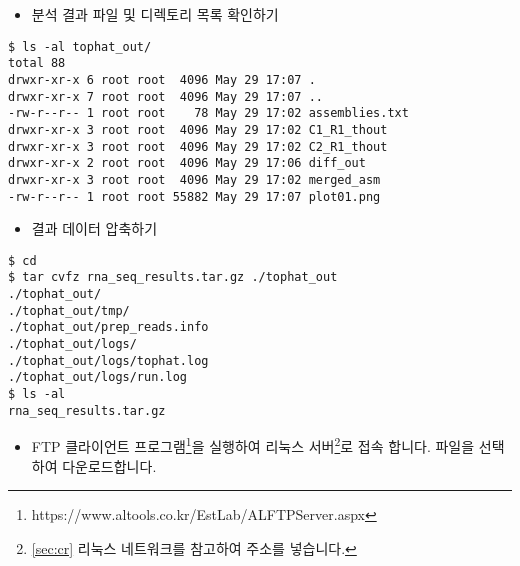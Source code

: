 \documentclass{article}
\begin{document}
\begin{itemize}
\item
  \begin{itemize}
  분석 결과 파일 및 디렉토리 목록 확인하기 
  \end{itemize}
\end{itemize}
\begin{lstlisting}[frame=single,style=Bash,xleftmargin=1.4cm,xrightmargin=1.4cm]
$ ls -al tophat_out/
total 88
drwxr-xr-x 6 root root  4096 May 29 17:07 .
drwxr-xr-x 7 root root  4096 May 29 17:07 ..
-rw-r--r-- 1 root root    78 May 29 17:02 assemblies.txt
drwxr-xr-x 3 root root  4096 May 29 17:02 C1_R1_thout
drwxr-xr-x 3 root root  4096 May 29 17:02 C2_R1_thout
drwxr-xr-x 2 root root  4096 May 29 17:06 diff_out
drwxr-xr-x 3 root root  4096 May 29 17:02 merged_asm
-rw-r--r-- 1 root root 55882 May 29 17:07 plot01.png
\end{lstlisting}

\begin{itemize}
\item
  \begin{itemize}
  결과 데이터 압축하기  
  \end{itemize}
\end{itemize}
\begin{lstlisting}[frame=single,style=Bash,xleftmargin=1.4cm,xrightmargin=1.4cm]
$ cd
$ tar cvfz rna_seq_results.tar.gz ./tophat_out
./tophat_out/
./tophat_out/tmp/
./tophat_out/prep_reads.info
./tophat_out/logs/
./tophat_out/logs/tophat.log
./tophat_out/logs/run.log
$ ls -al
rna_seq_results.tar.gz
\end{lstlisting}

\begin{itemize}
\item
  \begin{itemize}
  FTP 클라이언트 프로그램\footnote{https://www.altools.co.kr/EstLab/ALFTPServer.aspx}을 실행\cite{Feldmesser:2014hd}하여 리눅스 서버\footnote{\ref{sec:cr} 리눅스 네트워크를 참고하여 주소를 넣습니다.}로 접속\cite{Reid:2014jy} 합니다.  파일을 선택하여 다운로드합니다.
  \end{itemize}
\end{itemize}

\clearpage


\clearpage

\end{document}
